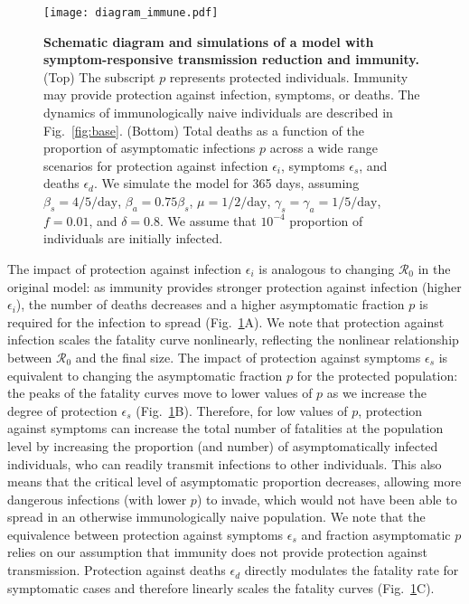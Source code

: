 \documentclass[12pt]{article}
\newcommand{\fref}[1]{Fig.~\ref{fig:#1}}
\newcommand{\RR}{\ensuremath{{\mathcal R}}\xspace}
\begin{document}
\begin{figure}[!ht]
\texttt{[image: diagram\_immune.pdf]}
\caption{
\textbf{Schematic diagram and simulations of a model with symptom-responsive transmission reduction and immunity.}
(Top) The subscript $p$ represents protected individuals. 
Immunity may provide protection against infection, symptoms, or deaths.
The dynamics of immunologically naive individuals are described in \fref{base}.
(Bottom) Total deaths as a function of the proportion of asymptomatic infections $p$ across a wide range scenarios for protection against infection $\epsilon_i$, symptoms $\epsilon_s$, and deaths $\epsilon_d$.
We simulate the model for 365 days, assuming $\beta_s = 4/5/\mathrm{day}$, $\beta_a = 0.75 \beta_s$, $\mu=1/2/\mathrm{day}$, $\gamma_s=\gamma_a=1/5/\mathrm{day}$, $f=0.01$, and $\delta=0.8$.
We assume that $10^{-4}$ proportion of individuals are initially infected.
}
\label{fig:immune}
\end{figure}

The impact of protection against infection $\epsilon_i$ is analogous to changing $\RR_0$ in the original model: as immunity provides stronger protection against infection (higher $\epsilon_i$), the number of deaths decreases and a higher asymptomatic fraction $p$ is required for the infection to spread (\fref{immune}A).
We note that protection against infection scales the fatality curve nonlinearly, reflecting the nonlinear relationship between $\RR_0$ and the final size.
The impact of protection against symptoms $\epsilon_s$ is equivalent to changing the asymptomatic fraction $p$ for the protected population:
the peaks of the fatality curves move to lower values of $p$ as we increase the degree of protection $\epsilon_s$ (\fref{immune}B).
Therefore, for low values of $p$, protection against symptoms can increase the total number of fatalities at the population level by increasing the proportion (and number) of asymptomatically infected individuals, who can readily transmit infections to other individuals.
This also means that the critical level of asymptomatic proportion decreases, allowing more dangerous infections (with lower $p$) to invade, which would not have been able to spread in an otherwise immunologically naive population.
We note that the equivalence between protection against symptoms $\epsilon_s$ and fraction asymptomatic $p$ relies on our assumption that immunity does not provide protection against transmission.
Protection against deaths $\epsilon_d$ directly modulates the fatality rate for symptomatic cases and therefore linearly scales the fatality curves (\fref{immune}C).
\end{document}
